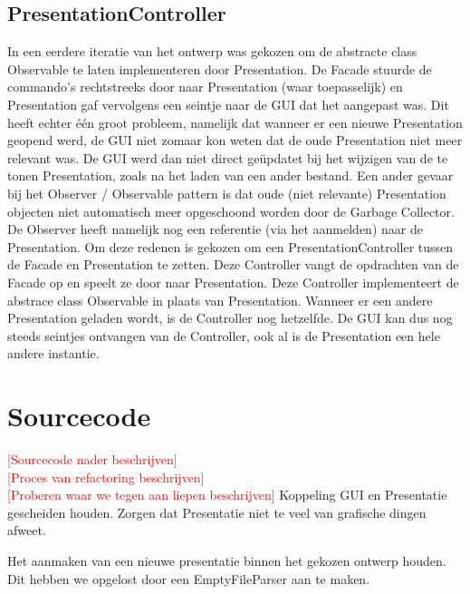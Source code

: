 \documentclass[a4paper]{article}
\newcommand{\todo}[1]{\textcolor{red}{[#1]}}
\newcommand{\1}[0]{\'{e}\'{e}n}
\begin{document}
\subsection{PresentationController}
\label{sub:presCntrllr}
In een eerdere iteratie van het ontwerp was gekozen om de abstracte class Observable te laten implementeren door Presentation. De Facade stuurde de commando's rechtstreeks door naar Presentation (waar toepasselijk) en Presentation gaf vervolgens een seintje naar de GUI dat het aangepast was. Dit heeft echter \1 groot probleem, namelijk dat wanneer er een nieuwe Presentation geopend werd, de GUI niet zomaar kon weten dat de oude Presentation niet meer relevant was. De GUI werd dan niet direct ge\"{u}pdatet bij het wijzigen van de te tonen Presentation, zoals na het laden van een ander bestand. Een ander gevaar bij het Observer / Observable pattern is dat oude (niet relevante) Presentation objecten niet automatisch meer opgeschoond worden door de Garbage Collector. De Observer heeft namelijk nog een referentie (via het aanmelden) naar de Presentation. Om deze redenen is gekozen om een PresentationController tussen de Facade en Presentation te zetten. Deze Controller vangt de opdrachten van de Facade op en speelt ze door naar Presentation. Deze Controller implementeert de abstrace class Observable in plaats van Presentation. Wanneer er een andere Presentation geladen wordt, is de Controller nog hetzelfde. De GUI kan dus nog steeds seintjes ontvangen van de Controller, ook al is de Presentation een hele andere instantie.

\section{Sourcecode}
\label{sec:source}
\todo{Sourcecode nader beschrijven}
\\
\todo{Proces van refactoring beschrijven}
\\
\todo{Proberen waar we tegen aan liepen beschrijven}
Koppeling GUI en Presentatie gescheiden houden. Zorgen dat Presentatie niet te
veel van grafische dingen afweet.

Het aanmaken van een nieuwe presentatie binnen het gekozen ontwerp houden.
Dit hebben we opgelost door een EmptyFileParser aan te maken.
\end{document}
